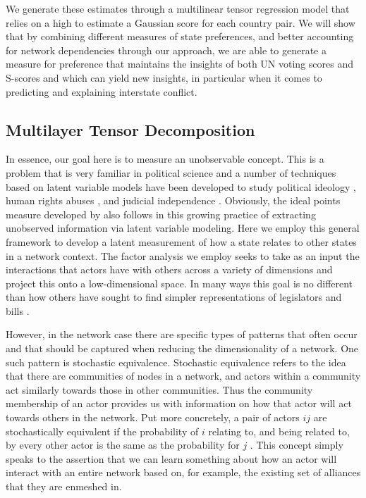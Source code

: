 We generate these estimates through a multilinear tensor regression model that relies on a high to estimate a Gaussian score for each country pair. We will show that by combining different measures of state preferences, and better accounting for network dependencies through our approach, we are able to generate a measure for preference that maintains the insights of both UN voting scores and S-scores and which can yield new insights, in particular when it comes to predicting and explaining interstate conflict.

\subsection*{Multilayer Tensor Decomposition}

In essence, our goal here is to measure an unobservable concept. This is a problem that is very familiar in political science and a number of techniques based on latent variable models have been developed to study political ideology \citep{martin:quinn:2002,konig:etal:2013}, human rights abuses \citep{fariss:2014}, and judicial independence \citep{linzer:staton:2015}. Obviously, the ideal points measure developed by \citet{bailey:etal:2015} also follows in this growing practice of extracting unobserved information via latent variable modeling. Here we employ this general framework to develop a latent measurement of how a state relates to other states in a network context. The factor analysis we employ seeks to take as an input the interactions that actors have with others across a variety of dimensions and project this onto a low-dimensional space. In many ways this goal is no different than how others have sought to find simpler representations of legislators and bills \citep{poole:rosenthal:1985,clinton:etal:2004}.

However, in the network case there are specific types of patterns that often occur and that should be captured when reducing the dimensionality of a network. One such pattern is stochastic equivalence. Stochastic equivalence refers to the idea that there are communities of nodes in a network, and actors within a community act similarly towards those in other communities. Thus the community membership of an actor provides us with information on how that actor will act towards others in the network. Put more concretely, a pair of actors $ij$ are stochastically equivalent if the probability of $i$ relating to, and being related to, by every other actor is the same as the probability for $j$ \citep{anderson:etal:1992}. This concept simply speaks to the assertion that we can learn something about how an actor will interact with an entire network based on, for example, the existing set of alliances that they are enmeshed in.

